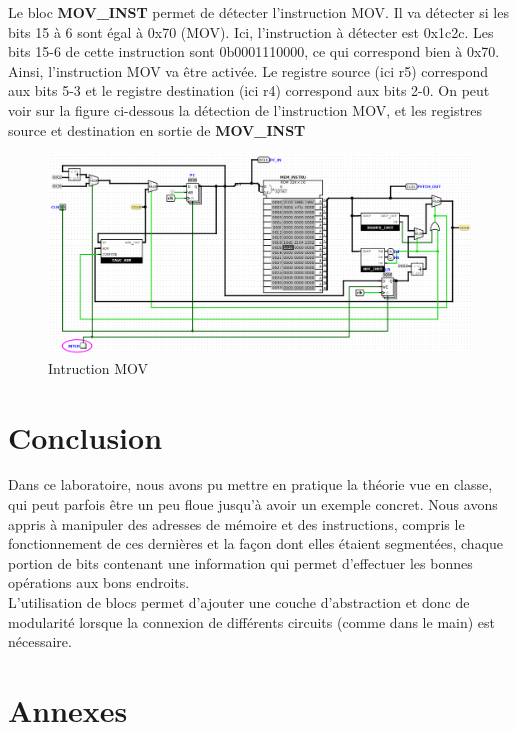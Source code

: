 \documentclass[a4paper]{article} %
\begin{document}
Le bloc \textbf{MOV\_INST} permet de détecter l'instruction MOV. Il va détecter si les bits 15 à 6 sont égal à 0x70 (MOV). Ici, l'instruction à détecter est 0x1c2c. Les bits 15-6 de cette instruction sont 0b0001110000, ce qui correspond bien à 0x70. 
\\Ainsi, l'instruction MOV va être activée. Le registre source (ici r5) correspond aux bits 5-3 et le registre destination (ici r4) correspond aux bits 2-0. On peut voir sur la figure ci-dessous la détection de l'instruction MOV, et les registres source et destination en sortie de \textbf{MOV\_INST}

\begin{figure}[H]
    \centering
    \includegraphics[width=1\textwidth]{src/FETCH_INTER_1c2c.png}
    \caption{Intruction MOV}
    \label{fetch_inter}
\end{figure}

\section{Conclusion}
Dans ce laboratoire, nous avons pu mettre en pratique la théorie vue en classe, qui peut parfois être un peu floue jusqu'à avoir un exemple concret. Nous avons appris à manipuler des adresses de mémoire et des instructions, compris le fonctionnement de ces dernières et la façon dont elles étaient segmentées, chaque portion de bits contenant une information qui permet d'effectuer les bonnes opérations aux bons endroits. \\
L'utilisation de blocs permet d'ajouter une couche d'abstraction et donc de modularité lorsque la connexion de différents circuits (comme dans le main) est nécessaire.
\section{Annexes}
\end{document}
